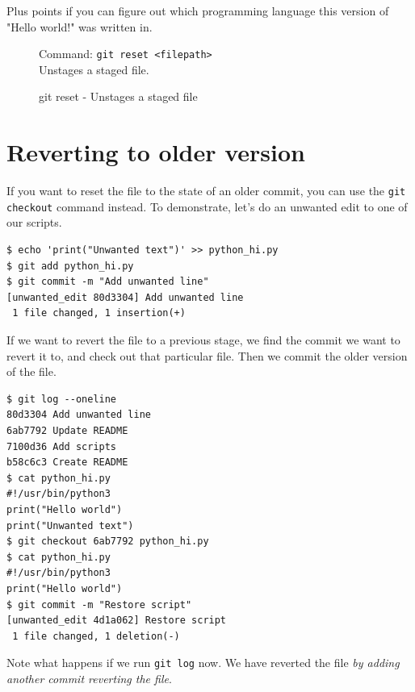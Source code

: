 \documentclass[../main/git_course_main.tex]{subfiles}
\begin{document}
Plus points if you can figure out which programming language this version
of "Hello world!" was written in.

\begin{figure}[h!]
\begin{bluebox}
Command: \verb$git reset <filepath>$ \\

Unstages a staged file.
\end{bluebox}
\label{command:reset}
\caption{git reset - Unstages a staged file}
\end{figure}

\section{Reverting to older version}

If you want to reset the file to the state of an older commit, you can use the \verb$git checkout$ command instead. To demonstrate, let's do an unwanted edit to one of our scripts.

\begin{codebox}
\begin{lstlisting}
$ echo 'print("Unwanted text")' >> python_hi.py
$ git add python_hi.py
$ git commit -m "Add unwanted line"
[unwanted_edit 80d3304] Add unwanted line
 1 file changed, 1 insertion(+)
\end{lstlisting}
\end{codebox}

If we want to revert the file to a previous stage, we find the commit we want to revert it to, and check out that particular file. Then we commit the older version of the file.

\begin{codebox}
\begin{lstlisting}
$ git log --oneline
80d3304 Add unwanted line
6ab7792 Update README
7100d36 Add scripts
b58c6c3 Create README
$ cat python_hi.py
#!/usr/bin/python3
print("Hello world")
print("Unwanted text")
$ git checkout 6ab7792 python_hi.py
$ cat python_hi.py
#!/usr/bin/python3
print("Hello world")
$ git commit -m "Restore script"
[unwanted_edit 4d1a062] Restore script
 1 file changed, 1 deletion(-)
\end{lstlisting}
\end{codebox}

Note what happens if we run \verb$git log$ now. We have reverted the file \textit{by adding another commit reverting the file}.
\end{document}
